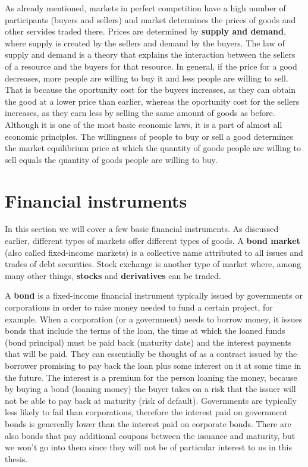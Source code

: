 \documentclass[times, utf8, diplomski]{fer}
\begin{document}
As already mentioned, markets in perfect competition have a high number of participants (buyers and sellers) and market determines the prices of goods and other servides traded there. Prices are determined by \textbf{supply and demand}, where supply is created by the sellers and demand by the buyers. The law of supply and demand is a theory that explains the interaction between the sellers of a resource and the buyers for that resource. In general, if the price for a good decreases, more people are willing to buy it and less people are willing to sell. That is because the oportunity cost for the buyers increases, as they can obtain the good at a lower price than earlier, whereas the oportunity cost for the sellers increases, as they earn less by selling the same amount of goods as before. Although it is one of the most basic economic laws, it is a part of almost all economic principles. The willingness of people to buy or sell a good determines the market equilibrium price at which the quantity of goods people are willing to sell equals the quantity of goods people are willing to buy. 

\section{Financial instruments}
In this section we will cover a few basic financial instruments. As discussed earlier, different types of markets offer different types of goods. A \textbf{bond market} (also called fixed-income markets) is a collective name attributed to all issues and trades of debt securities. Stock exchange is another type of market where, among many other things, \textbf{stocks} and \textbf{derivatives} can be traded. 

\hfill \break
A \textbf{bond} is a fixed-income financial instrument typically issued by governments or corporations in order to raise money needed to fund a certain project, for example. When a corporation (or a government) needs to borrow money, it issues bonds that include the terms of the loan, the time at which the loaned funds (bond principal) must be paid back (maturity date) and the interest payments that will be paid. They can essentially be thought of as a contract issued by the borrower promising to pay back the loan plus some interest on it at some time in the future. The interest is a premium for the person loaning the money, because by buying a bond (loaning money) the buyer takes on a risk that the issuer will not be able to pay back at maturity (risk of default). Governments are typically less likely to fail than corporations, therefore the interest paid on government bonds is genereally lower than the interest paid on corporate bonds. There are also bonds that pay additional coupons between the issuance and maturity, but we won't go into them since they will not be of particular interest to us in this thesis.
\end{document}
